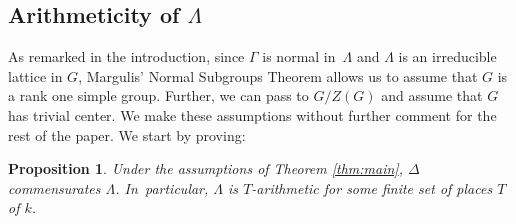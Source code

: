 \documentclass[11pt]{article}
\numberwithin{equation}{section}\providecommand{\llangle}{\langle\!\langle}\providecommand{\rrangle}{\rangle\!\rangle}\providecommand{\Asterisk}{\ast}
\newtheorem{prop}[thm]{Proposition}
\theoremstyle{definition}
\begin{document}
\subsection{Arithmeticity of $\Lambda$}\label{sec:arithm}
As remarked in the introduction, since $\Gamma$ is normal in~$\Lambda$ and $\Lambda$ is an irreducible lattice in $G$, Margulis' Normal Subgroups Theorem allows us to assume that $G$ is a rank one simple group. Further, we can pass to $G/Z(G)$ and assume that $G$ has trivial center. We make these assumptions without further comment for the rest of the paper. We start by proving:
\begin{prop}\label{prop:Lambda-arithm}
Under the assumptions of Theorem \ref{thm:main}, $\Delta$ commensurates $\Lambda$. In~particular, $\Lambda$ is $T$-arithmetic for some finite set of places $T$ of $k$.
\end{prop}
\end{document}
